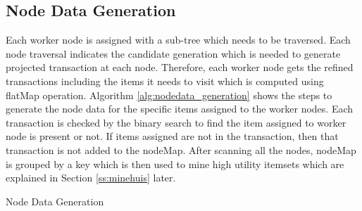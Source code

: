 \documentclass[11pt,openright]{report}
\begin{document}
\newpage
\subsection{Node Data Generation} \label{ss:generate_nodedata}
Each worker node is assigned with a sub-tree which needs to be traversed. Each node traversal indicates the candidate generation which is needed to generate projected transaction at each node. Therefore, each worker node gets the refined transactions including the items it needs to visit which is computed using flatMap operation. Algorithm \ref{alg:nodedata_generation} shows the steps to generate the node data for the specific items assigned to the worker nodes. Each transaction is checked by the binary search to find the item assigned to worker node is present or not. If items assigned are not in the transaction, then that transaction is not added to the nodeMap. After scanning all the nodes, nodeMap is grouped by a key which is then used to mine high utility itemsets which are explained in Section \ref{ss:minehuis} later.

{\SetAlgoNoLine
	\begin{algorithm}
		
		
		\caption{Node Data Generation}           
		\label{alg:nodedata_generation}
	\end{algorithm}
}

\newpage
\end{document}
